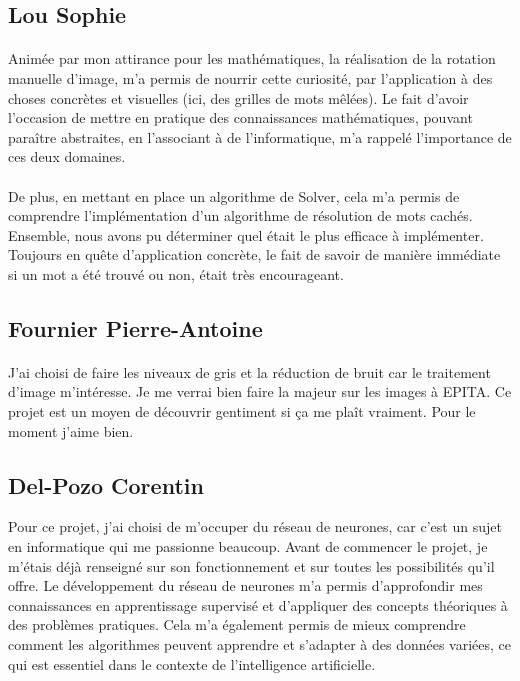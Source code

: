 \documentclass{article}
\begin{document}
\subsection{Lou Sophie}
\paragraph{}
Animée par mon attirance pour les mathématiques, la réalisation de la rotation manuelle d’image, m’a permis de nourrir cette curiosité, par l’application à des choses concrètes et visuelles (ici, des grilles de mots mêlées). Le fait d’avoir l’occasion de mettre en pratique des connaissances mathématiques, pouvant paraître abstraites, en l’associant à de l’informatique, m’a rappelé l’importance de ces deux domaines.
\paragraph{}
De plus, en mettant en place un algorithme de Solver, cela m’a permis de comprendre l’implémentation d’un algorithme de résolution de mots cachés. 
Ensemble, nous avons pu déterminer quel était le plus efficace à implémenter.
Toujours en quête d’application concrète, le fait de savoir de manière immédiate si un mot a été trouvé ou non, était très encourageant.
\subsection{Fournier Pierre-Antoine}
\paragraph{}
J’ai choisi de faire les niveaux de gris et la réduction de bruit car le traitement d’image m’intéresse. Je me verrai bien faire la majeur sur les images à EPITA. Ce projet est un moyen de découvrir gentiment si ça me plaît vraiment. Pour le moment j’aime bien.
\subsection{Del-Pozo Corentin}

Pour ce projet, j'ai choisi de m'occuper du réseau de neurones, car c'est un sujet en informatique qui me passionne beaucoup. Avant de commencer le projet, je m'étais déjà renseigné sur son fonctionnement et sur toutes les possibilités qu'il offre. Le développement du réseau de neurones m'a permis d'approfondir mes connaissances en apprentissage supervisé et d'appliquer des concepts théoriques à des problèmes pratiques. Cela m'a également permis de mieux comprendre comment les algorithmes peuvent apprendre et s'adapter à des données variées, ce qui est essentiel dans le contexte de l'intelligence artificielle.
\\
\end{document}
